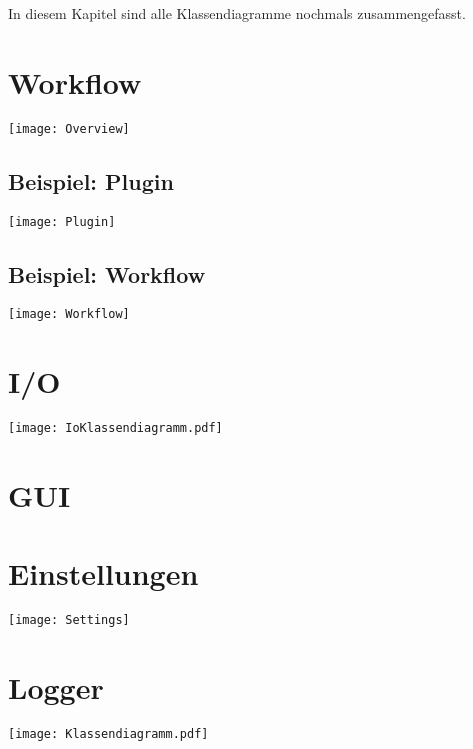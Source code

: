 In diesem Kapitel sind alle Klassendiagramme nochmals zusammengefasst.
\section{Workflow}
\graphicspath{{./img/workflow/}}
\texttt{[image: Overview]}
\subsection{Beispiel: Plugin}
\texttt{[image: Plugin]}
\subsection{Beispiel: Workflow}
\texttt{[image: Workflow]}
\newpage
\section{I/O}
\graphicspath{{./img/io/}}
\texttt{[image: IoKlassendiagramm.pdf]}
\newpage
\section{GUI}
\graphicspath{{./img/gui/}}
\newpage
\section{Einstellungen}
\graphicspath{{./img/settings/}}
\texttt{[image: Settings]}
\newpage
\section{Logger}
\graphicspath{{./img/logger/}}
\texttt{[image: Klassendiagramm.pdf]}
